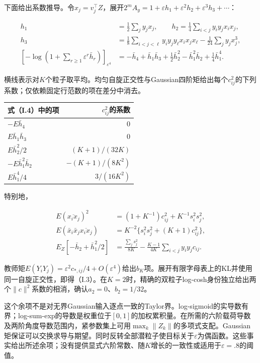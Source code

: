 \documentclass[11pt,a4paper]{article}
\begin{document}
下面给出系数推导。令\(x_j=v_j^\top Z\)，展开\(2^mA_y=1+\varepsilon h_1+\varepsilon^2h_2+\varepsilon^3h_3+\cdots\)：

\[
\begin{aligned}
h_1&=\tfrac12\sum_jy_jx_j,\qquad h_2=\tfrac14\sum_{i<j}y_iy_jx_ix_j,\\
h_3&=\tfrac18\sum_{i<j<\ell}y_iy_jy_\ell x_ix_jx_\ell-\tfrac1{24}\sum_jy_jx_j^3,\\
[-\log(1+\textstyle\sum_{r\ge1}\varepsilon^r\bar h_r)]_{\varepsilon^4}
&=-\bar h_4+\bar h_1\bar h_3+\tfrac12\bar h_2^2-\bar h_1^2\bar h_2+\tfrac14\bar h_1^4.
\end{aligned}
\tag{I.4}
\]

横线表示对\(K\)个粒子取平均。均匀自旋正交性与Gaussian四阶矩给出每个\(c_{ij}^2\)的下列系数；仅依赖固定行范数的项在差分中消去。

\begin{longtable}[]{@{}lr@{}}
\toprule\noalign{}
式（I.4）中的项 & \(c_{ij}^2\)的系数 \\
\midrule\noalign{}
\endhead
\bottomrule\noalign{}
\endlastfoot
\(-E\bar h_4\) & \(0\) \\
\(E\bar h_1\bar h_3\) & \(0\) \\
\(E\bar h_2^2/2\) & \((K+1)/(32K)\) \\
\(-E\bar h_1^2\bar h_2\) & \(-(K+1)/(8K^2)\) \\
\(E\bar h_1^4/4\) & \(3/(16K^2)\) \\
\end{longtable}

特别地，

\[
\begin{aligned}
E(\overline{x_ix_j})^2&=(1+K^{-1})c_{ij}^2+K^{-1}s_i^2s_j^2,\\
E(\bar x_i\bar x_j\overline{x_ix_j})&=K^{-2}\{s_i^2s_j^2+(K+1)c_{ij}^2\},\\
E_Z[-\bar h_2+\bar h_1^2/2]
&=\frac{\sum_js_j^2}{8K}-\frac{K-1}{4K}\sum_{i<j}y_iy_jc_{ij}.
\end{aligned}
\tag{I.5}
\]

教师矩\(E(Y_iY_j)=\varepsilon^2c_{*,ij}/4+O(\varepsilon^4)\)给出\(b_K\)项。展开有限字母表上的KL并使用同一自旋正交性，即得（I.3）。在\(K=2\)时，精确的双粒子log-cosh身份独立给出两个\(\|c\|^2\)系数的相消，确认\(a_2=0\)、\(b_2=1/32\)。

这个余项不是对无界Gaussian输入逐点一致的Taylor界。log-sigmoid的实导数有界；log-sum-exp的导数是权重位于\([0,1]\)的加权累积量。在所需的六阶载荷导数及两阶角度导数范围内，紧参数集上可用\(\max_k\|Z_k\|\)的多项式支配。Gaussian矩保证可以交换求导与期望。同时反转全部潜粒子使目标关于\(\varepsilon\)为偶函数。这些事实给出所述余项；没有提供显式六阶常数、随\(K\)增长的一致性或适用于\(\varepsilon=.8\)的阈值。
\end{document}

